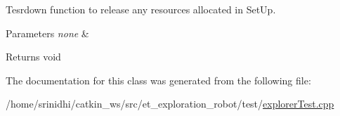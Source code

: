 Tesrdown function to release any resources allocated in Set\+Up. 


\begin{DoxyParams}{Parameters}
{\em none} & \\
\hline
\end{DoxyParams}
\begin{DoxyReturn}{Returns}
void 
\end{DoxyReturn}


The documentation for this class was generated from the following file\+:\begin{DoxyCompactItemize}
\item 
/home/srinidhi/catkin\+\_\+ws/src/et\+\_\+exploration\+\_\+robot/test/\hyperlink{explorerTest_8cpp}{explorer\+Test.\+cpp}\end{DoxyCompactItemize}
